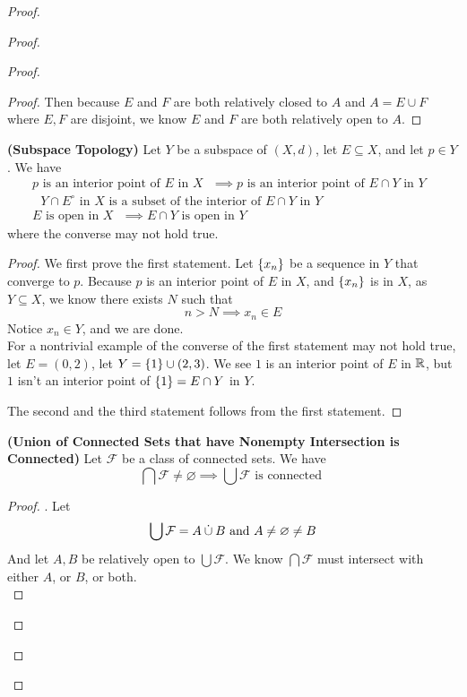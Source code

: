 \documentclass{report}
\begin{document}
\begin{proof}
\begin{proof}
\begin{proof}
\begin{proof}
Then because $E$ and  $F$ are both relatively closed to  $A$ and  $A=E\cup F$ where $E,F$ are disjoint, we know  $E$ and  $F$ are both relatively open to  $A$.
\end{proof}
\begin{theorem}
\label{8.3.2}
\textbf{(Subspace Topology)} Let $Y$ be a subspace of $(X,d)$, let $E\subseteq X$, and let $p\in  Y$. We have
\begin{gather}
p\text{ is an interior point of $E$ in $X$ }\implies p\text{ is an interior point of $E\cap Y$ in $Y$ } \\
\text{ $Y\cap E^\circ $ in $X$ is a subset of the interior of $E\cap Y$ in $Y$ }\\
E\text{ is open in $X$ }\implies E\cap Y\text{ is open in $Y$ }
\end{gather}
where the converse may not hold true.
\end{theorem}
\begin{proof}
We first prove the first statement. Let $\{ x_n \}$ be a sequence in $Y$ that converge to $p$. Because  $p$ is an interior point of  $E$ in  $X$, and  $\{ x_n \}$ is in $X$, as  $Y\subseteq X$, we know there exists $N$ such that 
 \begin{equation}
n>N\implies x_n\in E
\end{equation}
Notice $x_n\in Y$, and we are done.\\

For a nontrivial example of the converse of the first statement may not hold true, let $E=(0,2)$, let $Y=\{ 1 \}\cup (2,3)$. We see $1$ is an interior point of  $E$ in  $\mathbb{R}$, but  $1$ isn't an interior point of  $\{ 1 \}=E\cap Y$ in $Y$.

The second and the third statement follows from the first statement. 
\end{proof}
\begin{theorem}
\label{8.3.3}
\textbf{(Union of Connected Sets that have Nonempty Intersection is Connected)} Let $\mathcal{F}$ be a class of connected sets. We have 
\begin{equation}
\bigcap \mathcal{F}\neq \varnothing \implies \bigcup \mathcal{F}\text{ is connected }
\end{equation}
\end{theorem}
\begin{proof}
. Let 
\begin{equation}
\bigcup  \mathcal{F}= A \mathbin{\dot{\cup}} B\text{ and }A\neq \varnothing\neq B
\end{equation}
And let $A,B$ be relatively open to  $\bigcup \mathcal{F}$. We know $\bigcap \mathcal{F}$ must intersect with either $A$, or  $B$, or both.\\


\end{proof}
\end{proof}
\end{proof}
\end{proof}
\end{document}
